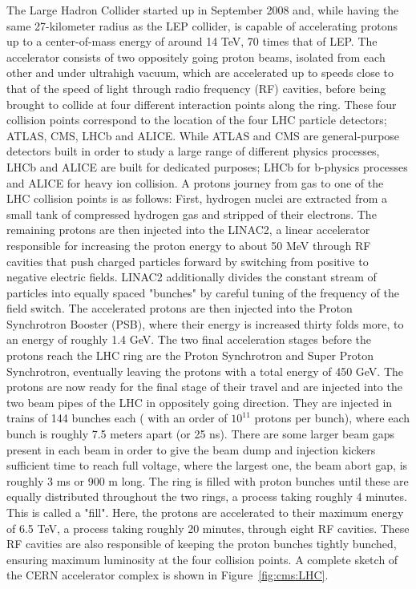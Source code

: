 The Large Hadron Collider started up in September 2008 and, while having the same 27-kilometer radius as the LEP collider, is capable of accelerating protons up to a center-of-mass energy of around 14 TeV, 70 times that of LEP. The accelerator consists of two oppositely going proton beams, isolated from each other and under ultrahigh vacuum, which are accelerated up to speeds close to that of the speed of light through radio frequency (RF) cavities, before being brought to collide at four different interaction points along the ring.
These four collision points correspond to the location of the four LHC particle detectors; ATLAS, CMS, LHCb and ALICE.
While ATLAS and CMS are general-purpose detectors built in order to study a large range of different physics processes, 
LHCb and ALICE are built for dedicated purposes; LHCb for b-physics processes and ALICE for heavy ion collision.
A protons journey from gas to one of the LHC collision points is as follows: First, hydrogen nuclei are extracted from a small tank of compressed hydrogen gas and stripped of their electrons. The remaining protons are then
injected into the LINAC2, a linear accelerator responsible for increasing the proton energy to about 50 MeV through RF cavities that push charged particles forward by switching from positive to negative electric fields. LINAC2 additionally divides the constant stream of particles into equally spaced "bunches" by careful tuning of the frequency of the field switch.
The accelerated protons are then injected into the Proton Synchrotron Booster (PSB), where their energy is increased thirty folds more, to an energy of roughly 1.4 GeV. The two final acceleration stages before the protons reach the LHC ring are the Proton Synchrotron and Super Proton Synchrotron, eventually leaving the protons with a total energy of 450 GeV. The protons are now ready for the final stage of their travel and are injected into the two beam pipes of the LHC in oppositely going direction. They are injected in trains of 144 bunches each ( with an order of $10^{11}$ protons per bunch), where each bunch is roughly 7.5 meters apart (or 25 ns). There are some larger beam gaps present in each beam in order to give the beam dump and injection kickers sufficient time to reach full voltage, where the largest one, the beam abort gap,  is roughly 3 ms or 900 m long. The ring is filled with proton bunches until these are equally distributed throughout the two rings, a process taking roughly 4 minutes. This is called a "fill". Here, the protons are accelerated to their maximum energy of 6.5 TeV, a process taking roughly 20 minutes, through eight RF cavities. These RF cavities are also responsible of keeping the proton bunches tightly bunched, ensuring maximum luminosity at the four collision points. A complete sketch of the CERN accelerator complex is shown in Figure~\ref{fig:cms:LHC}.

